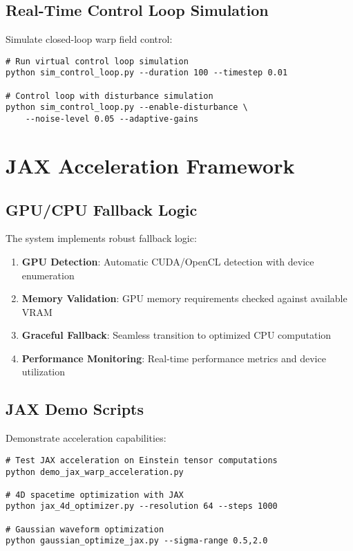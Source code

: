 \documentclass{article}
\begin{document}
\subsection{Real-Time Control Loop Simulation}

Simulate closed-loop warp field control:

\begin{lstlisting}
# Run virtual control loop simulation
python sim_control_loop.py --duration 100 --timestep 0.01

# Control loop with disturbance simulation
python sim_control_loop.py --enable-disturbance \
    --noise-level 0.05 --adaptive-gains
\end{lstlisting}

\section{JAX Acceleration Framework}

\subsection{GPU/CPU Fallback Logic}

The system implements robust fallback logic:

\begin{enumerate}
\item \textbf{GPU Detection}: Automatic CUDA/OpenCL detection with device enumeration
\item \textbf{Memory Validation}: GPU memory requirements checked against available VRAM
\item \textbf{Graceful Fallback}: Seamless transition to optimized CPU computation
\item \textbf{Performance Monitoring}: Real-time performance metrics and device utilization
\end{enumerate}

\subsection{JAX Demo Scripts}

Demonstrate acceleration capabilities:

\begin{lstlisting}
# Test JAX acceleration on Einstein tensor computations
python demo_jax_warp_acceleration.py

# 4D spacetime optimization with JAX
python jax_4d_optimizer.py --resolution 64 --steps 1000

# Gaussian waveform optimization
python gaussian_optimize_jax.py --sigma-range 0.5,2.0
\end{lstlisting}
\end{document}
